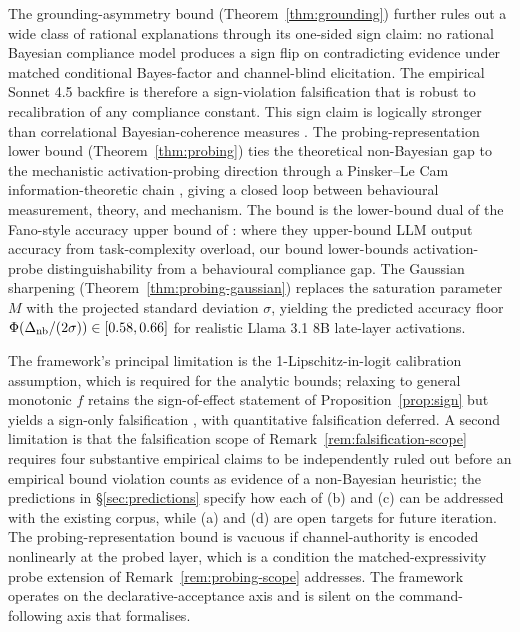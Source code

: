 \documentclass[11pt]{article}
\theoremstyle{definition}
\theoremstyle{remark}
\begin{document}
The grounding-asymmetry bound (Theorem~\ref{thm:grounding}) further rules out a
wide class of rational explanations through its one-sided sign claim: no rational
Bayesian compliance model produces a sign flip on contradicting evidence under
matched conditional Bayes-factor and channel-blind elicitation. The empirical
Sonnet 4.5 backfire is therefore a sign-violation falsification that is robust to
recalibration of any compliance constant. This sign claim is logically stronger
than correlational Bayesian-coherence measures \cite{imran2025bayes}. The
probing-representation lower bound (Theorem~\ref{thm:probing}) ties the theoretical
non-Bayesian gap to the mechanistic activation-probing direction through a
Pinsker--Le Cam information-theoretic chain
\cite{tsybakov2009nonparametric, coverthomas2006elements}, giving a closed loop
between behavioural measurement, theory, and mechanism. The bound is the lower-bound
dual of the Fano-style accuracy upper bound of \cite{wan2025fano}: where they
upper-bound LLM output accuracy from task-complexity overload, our bound
lower-bounds activation-probe distinguishability from a behavioural compliance gap.
The Gaussian sharpening (Theorem~\ref{thm:probing-gaussian}) replaces the
saturation parameter $M$ with the projected standard deviation $\sigma$, yielding
the predicted accuracy floor $\Phi(\Delta_{\textnormal{nb}}/(2\sigma)) \in [0.58, 0.66]$
for realistic Llama 3.1 8B late-layer activations.

The framework's principal limitation is the 1-Lipschitz-in-logit calibration
assumption, which is required for the analytic bounds; relaxing to general monotonic
$f$ retains the sign-of-effect statement of Proposition~\ref{prop:sign} but yields
a sign-only falsification , with quantitative falsification deferred. A second limitation is
that the falsification scope of Remark~\ref{rem:falsification-scope} requires four
substantive empirical claims to be independently ruled out before an empirical
bound violation counts as evidence of a non-Bayesian heuristic; the predictions in
\S\ref{sec:predictions} specify how each of (b) and (c) can be addressed with the
existing corpus, while (a) and (d) are open targets for future iteration. The
probing-representation bound is vacuous if channel-authority is encoded nonlinearly
at the probed layer, which is a condition the matched-expressivity probe extension
of Remark~\ref{rem:probing-scope} addresses. The framework operates on the
declarative-acceptance axis and is silent on the command-following axis that
\cite{wallace2024instruction} formalises.
\end{document}

